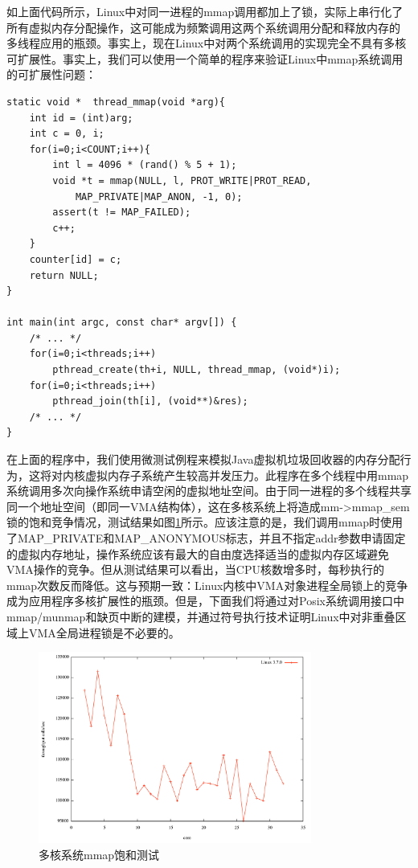 如上面代码所示，Linux中对同一进程的mmap调用都加上了锁，实际上串行化了所有虚拟内存分配操作，这可能成为频繁调用这两个系统调用分配和释放内存的
多线程应用的瓶颈。事实上，现在Linux中对两个系统调用的实现完全不具有多核可扩展性。事实上，我们可以使用一个简单的程序来验证Linux中mmap系统调用的可扩展性问题：

\begin{lstlisting}
static void *  thread_mmap(void *arg){
	int id = (int)arg;
	int c = 0, i;
	for(i=0;i<COUNT;i++){
		int l = 4096 * (rand() % 5 + 1);
		void *t = mmap(NULL, l, PROT_WRITE|PROT_READ,
			MAP_PRIVATE|MAP_ANON, -1, 0);
		assert(t != MAP_FAILED);
		c++;
	}
	counter[id] = c;
	return NULL;
}

int main(int argc, const char* argv[]) {
	/* ... */
	for(i=0;i<threads;i++)
		pthread_create(th+i, NULL, thread_mmap, (void*)i);
	for(i=0;i<threads;i++)
		pthread_join(th[i], (void**)&res);
	/* ... */
}
\end{lstlisting}

在上面的程序中，我们使用微测试例程来模拟Java虚拟机垃圾回收器的内存分配行为，这将对内核虚拟内存子系统产生较高并发压力。此程序在多个线程中用mmap系统调用多次向操作系统申请空闲的虚拟地址空间。由于同一进程的多个线程共享同一个地址空间（即同一VMA结构体），这在多核系统上将造成mm->mmap\_sem锁的饱和竞争情况，测试结果如图\ref{fig:mmap_test}所示。应该注意的是，我们调用mmap时使用了MAP\_PRIVATE和MAP\_ANONYMOUS标志，并且不指定addr参数申请固定的虚拟内存地址，操作系统应该有最大的自由度选择适当的虚拟内存区域避免VMA操作的竞争。但从测试结果可以看出，当CPU核数增多时，每秒执行的mmap次数反而降低。这与预期一致：Linux内核中VMA对象进程全局锁上的竞争成为应用程序多核扩展性的瓶颈。但是，下面我们将通过对Posix系统调用接口中mmap/munmap和缺页中断的建模，并通过符号执行技术证明Linux中对非重叠区域上VMA全局进程锁是不必要的。

\begin{figure}[ht]
\begin{center}
\includegraphics[width=0.8\textwidth]{figures/mmap_test.pdf}
\end{center}
\caption{多核系统mmap饱和测试}
\label{fig:mmap_test}
\end{figure}

